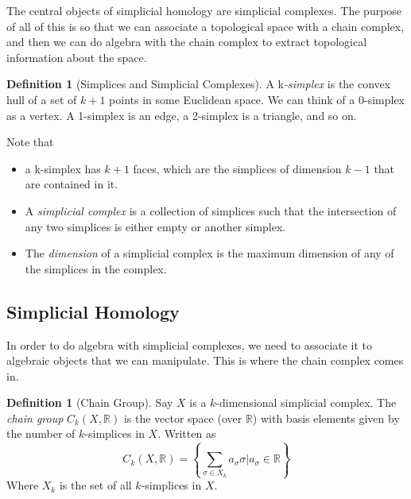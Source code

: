 \documentclass[12pt]{article}
\theoremstyle{plain}
\theoremstyle{definition}
\newtheorem{definition}[thm]{Definition}
\begin{document}
The central objects of simplicial homology are simplicial complexes. The purpose of all of this is so that we can associate a
topological space with a chain complex, and then we can do algebra with the chain complex to extract topological information about the space.


\begin{definition}[Simplices and Simplicial Complexes]

A k\textit{-simplex} is the convex hull of a set of $k+1$ points in some Euclidean space. We can think of a 0-simplex as a
  vertex. A 1-simplex is an edge, a 2-simplex is a triangle, and so on. 

  Note that \begin{itemize}
    \item a k-simplex has $k+1$ faces, which are the simplices of dimension $k-1$ that are
  contained in it.

    \item A \textit{simplicial complex} is a collection of simplices such that the intersection of any two simplices is either empty or
another simplex.

    \item The \textit{dimension} of a simplicial complex is the maximum dimension of any of the simplices in the complex. 

      \end{itemize}

\end{definition}

\subsection{Simplicial Homology}

In order to do algebra with simplicial complexes, we need to associate it to algebraic objects that
we can manipulate. This is where the chain complex comes in.

\begin{definition}[Chain Group]  Say $X$ is a $k$-dimensional simplicial complex. The \textit{chain group} $C_k(X,\mathbb{R})$
is the vector space (over $\mathbb{R}$) with basis elements given by the number of $k$-simplices in $X$. Written as 
\begin{equation*}
  C_k(X, \mathbb{R}) = \left \{ \sum_{\sigma \in X_k} a_\sigma \sigma | a_\sigma \in \mathbb{R} \right \}
\end{equation*}
Where $X_k$ is the set of all $k$-simplices in $X$.
\end{definition}
\end{document}
